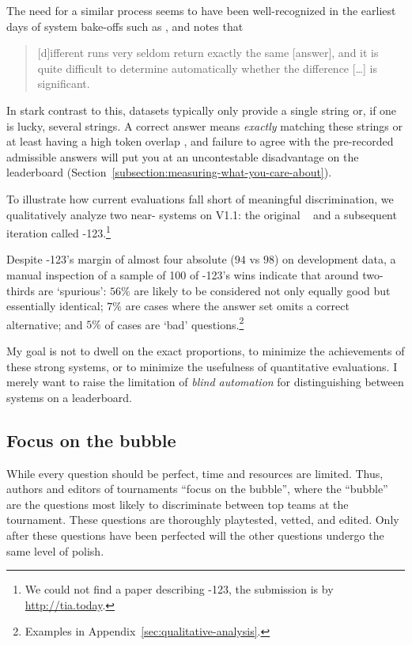 The need for a similar process seems to have been well-recognized
in the earliest days of \qa{} system bake-offs such as , and  notes that
\begin{quote}
    [d]ifferent  runs very seldom return exactly the same [answer], and it is quite difficult to determine automatically whether the difference [\dots] is significant.
\end{quote}
In stark contrast to this, \qa{} datasets typically only provide a single string or, if one is lucky,
several strings.
A correct answer means \emph{exactly} matching these strings or at least
having a high token overlap \fone{}, and failure to agree with the
pre-recorded admissible answers will put you at an uncontestable
disadvantage on the leaderboard (Section~\ref{subsection:measuring-what-you-care-about}).

To illustrate how current evaluations fall short of meaningful
discrimination, we qualitatively analyze two near-\sota{} systems on
\squad{} V1.1: the original \xlnet{}~\citep{yang-19} and a subsequent
iteration called \xlnet{}-123.\footnote{We could not find a paper
  describing \xlnet{}-123, the submission is by
  \url{http://tia.today}.}

Despite \xlnet{}-123's margin of almost four absolute \fone{} ($94$ vs
$98$) on development data, a manual inspection of a sample of 100 of
\xlnet{}-123's wins indicate that around two-thirds are `spurious':
$56\%$ are likely to be considered not only equally good but
essentially identical; $7\%$ are cases where the answer set omits a
correct alternative; and $5\%$ of cases are `bad'
questions.\footnote{Examples in
  Appendix~\ref{sec:qualitative-analysis}.}

My goal is not to dwell on the exact proportions, to minimize the achievements of these strong systems, or to minimize the usefulness of quantitative evaluations.
I merely want to raise the limitation of \emph{blind automation} for distinguishing between
systems on a leaderboard.

\subsection{Focus on the bubble}

While every question should be perfect, time and resources are limited.
Thus, authors and editors of tournaments ``focus on the bubble'', where the ``bubble'' are the questions most likely to discriminate between top teams at the tournament.
These questions are thoroughly playtested, vetted, and edited.
Only after these questions have been perfected will the other questions undergo the same level of polish.

